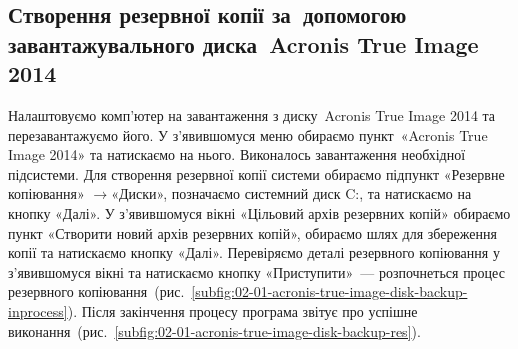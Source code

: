 \documentclass[
	a4paper,
	oneside,
	DIV = 12,
	fontsize = 13pt,
	headings = normal,
]{scrartcl}
\newcommand{\Mytextrightarrow}{$\rightarrow$\hspace{0.25em}}
\begin{document}
		\subsection{Створення резервної копії за~допомогою завантажувального диска~\textenglish{Acronis True Image 2014}}
		\label{ssec:acronis-true-image-2014-backup}
			Налаштовуємо комп'ютер на завантаження з диску~\textenglish{Acronis True Image 2014} та перезавантажуємо його. У з'явившомуся меню обираємо пункт~\textenglish{«Acronis True Image 2014»} та натискаємо на нього. Виконалось завантаження необхідної підсистеми. Для створення резервної копії системи обираємо підпункт «Резервне копіювання» \Mytextrightarrow «Диски», позначаємо системний диск \textenglish{C:}, та натискаємо на кнопку «Далі». У з'явившомуся вікні «Цільовий архів резервних копій» обираємо пункт «Створити новий архів резервних копій», обираємо шлях для збереження копії та натискаємо кнопку «Далі». Перевіряємо деталі резервного копіювання у з'явившомуся вікні та натискаємо кнопку «Приступити»~— розпочнеться процес резервного копіювання~(рис.~\ref{subfig:02-01-acronis-true-image-disk-backup-inprocess}). Після закінчення процесу програма звітує про успішне виконання~(рис.~\ref{subfig:02-01-acronis-true-image-disk-backup-res}).
\end{document}
